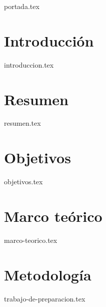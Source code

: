 \documentclass{article}
\begin{document}
{portada.tex}
\tableofcontents
\newpage
\section{Introducción}
{introduccion.tex}

\section{Resumen}
{resumen.tex}

\section{Objetivos}
{objetivos.tex}

\section {Marco teórico}
{marco-teorico.tex}

\section{Metodología}
{trabajo-de-preparacion.tex}
\end{document}
